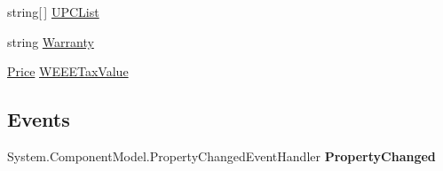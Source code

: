 \begin{DoxyCompactItemize}
\begin{DoxyCompactList}\small\item\em \end{DoxyCompactList}\item 
\hypertarget{class_price___comparison_1_1amazon_1_1ecs_1_1_item_attributes_acb31adb4c63b2190d292907e462eeb50}{string\mbox{[}$\,$\mbox{]} \hyperlink{class_price___comparison_1_1amazon_1_1ecs_1_1_item_attributes_acb31adb4c63b2190d292907e462eeb50}{U\-P\-C\-List}}\label{class_price___comparison_1_1amazon_1_1ecs_1_1_item_attributes_acb31adb4c63b2190d292907e462eeb50}

\begin{DoxyCompactList}\small\item\em \end{DoxyCompactList}\item 
\hypertarget{class_price___comparison_1_1amazon_1_1ecs_1_1_item_attributes_a241bc8d4f030067400f4dc3a24f61d11}{string \hyperlink{class_price___comparison_1_1amazon_1_1ecs_1_1_item_attributes_a241bc8d4f030067400f4dc3a24f61d11}{Warranty}}\label{class_price___comparison_1_1amazon_1_1ecs_1_1_item_attributes_a241bc8d4f030067400f4dc3a24f61d11}

\begin{DoxyCompactList}\small\item\em \end{DoxyCompactList}\item 
\hypertarget{class_price___comparison_1_1amazon_1_1ecs_1_1_item_attributes_a875566026093faf5778b6eff80c4ce88}{\hyperlink{class_price___comparison_1_1amazon_1_1ecs_1_1_price}{Price} \hyperlink{class_price___comparison_1_1amazon_1_1ecs_1_1_item_attributes_a875566026093faf5778b6eff80c4ce88}{W\-E\-E\-E\-Tax\-Value}}\label{class_price___comparison_1_1amazon_1_1ecs_1_1_item_attributes_a875566026093faf5778b6eff80c4ce88}

\begin{DoxyCompactList}\small\item\em \end{DoxyCompactList}\end{DoxyCompactItemize}
\subsection*{Events}
\begin{DoxyCompactItemize}
\item 
\hypertarget{class_price___comparison_1_1amazon_1_1ecs_1_1_item_attributes_ad6031af5fc51aee0ca74e060be4c9634}{System.\-Component\-Model.\-Property\-Changed\-Event\-Handler {\bfseries Property\-Changed}}\label{class_price___comparison_1_1amazon_1_1ecs_1_1_item_attributes_ad6031af5fc51aee0ca74e060be4c9634}

\end{DoxyCompactItemize}
